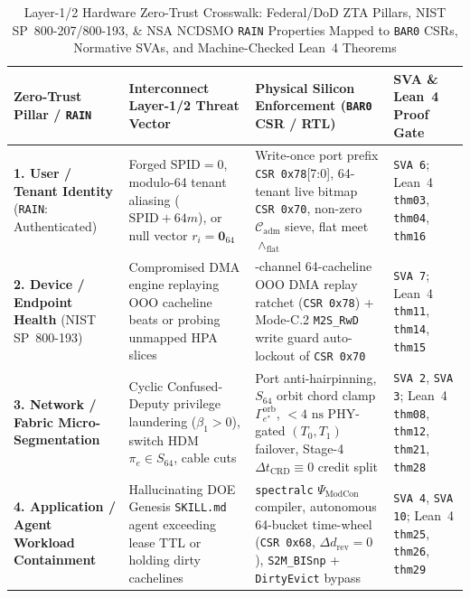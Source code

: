 \documentclass[10pt,twocolumn]{article}
\theoremstyle{spectralthm}
\begin{document}
\begin{table}[!tp]
\centering
\footnotesize
\setlength{\tabcolsep}{5.6pt}
\renewcommand{\arraystretch}{1.22}
\caption{Layer-1/2 Hardware Zero-Trust Crosswalk: Federal/DoD ZTA Pillars, NIST SP~800-207/800-193, \& NSA NCDSMO \texttt{RAIN} Properties Mapped to \texttt{BAR0} CSRs, Normative SVAs, and Machine-Checked Lean~4 Theorems}
\label{tab:zta_crosswalk}
\begin{tabularx}{\textwidth}{@{}>{\raggedright\hyphenpenalty=10000\exhyphenpenalty=10000\arraybackslash}p{3.35cm} >{\raggedright\arraybackslash}p{4.00cm} >{\raggedright\arraybackslash}X >{\raggedright\arraybackslash}p{4.15cm}@{}}
\toprule
\textbf{Zero-Trust Pillar / \texttt{RAIN}} & \textbf{Interconnect Layer-1/2 Threat Vector} & \textbf{Physical Silicon Enforcement (\texttt{BAR0} CSR / RTL)} & \textbf{SVA \& Lean~4 Proof Gate} \\
\midrule
\textbf{1. User / Tenant Identity} (\texttt{RAIN}: Authenticated) & Forged $\mathrm{SPID}=0$, modulo-64 tenant aliasing ($\mathrm{SPID}+64m$), or null vector $r_i=\mathbf{0}_{64}$ & Write-once port prefix \texttt{CSR 0x78}[7:0], 64-tenant live bitmap \texttt{CSR 0x70}, non-zero $\mathcal{C}_{\mathrm{adm}}$ sieve, flat meet $\wedge_{\mathrm{flat}}$ & \texttt{SVA 6}; Lean~4 \texttt{thm03}, \texttt{thm04}, \texttt{thm16} \\
\textbf{2. Device / Endpoint Health} (NIST SP~800-193) & Compromised DMA engine replaying OOO cacheline beats or probing unmapped HPA slices & 4-channel 64-cacheline OOO DMA replay ratchet (\texttt{CSR 0x78}) + Mode-C.2 \texttt{M2S\_RwD} write guard auto-lockout of \texttt{CSR 0x70} & \texttt{SVA 7}; Lean~4 \texttt{thm11}, \texttt{thm14}, \texttt{thm15} \\
\textbf{3. Network / Fabric \mbox{Micro-Segmentation}} & Cyclic Confused-Deputy privilege laundering ($\beta_1 > 0$), switch HDM $\pi_e \in S_{64}$, cable cuts & Port anti-hairpinning, $S_{64}$ orbit chord clamp $\Gamma_{e^*}^{\mathrm{orb}}$, $<4\text{~ns}$ PHY-gated $(T_0,T_1)$ failover, Stage-4 $\Delta t_{\mathrm{CRD}}\equiv 0$ credit split & \texttt{SVA 2}, \texttt{SVA 3}; Lean~4 \texttt{thm08}, \texttt{thm12}, \texttt{thm21}, \texttt{thm28} \\
\textbf{4. Application / Agent Workload Containment} & Hallucinating DOE Genesis \texttt{SKILL.md} agent exceeding lease TTL or holding dirty cachelines & \texttt{spectralc} $\Psi_{\mathrm{ModCon}}$ compiler, autonomous 64-bucket time-wheel (\texttt{CSR 0x68}, $\Delta d_{\mathrm{rev}}=0$), \texttt{S2M\_BISnp} + \texttt{DirtyEvict} bypass & \texttt{SVA 4}, \texttt{SVA 10}; Lean~4 \texttt{thm25}, \texttt{thm26}, \texttt{thm29} \\

\end{tabularx}
\end{table}
\end{document}

